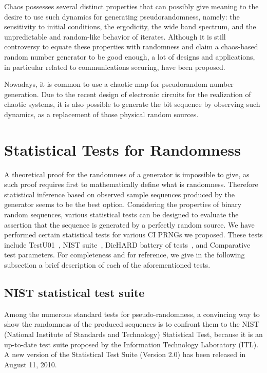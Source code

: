 Chaos possesses several distinct properties that can possibly give meaning to the desire to use such dynamics for generating pseudorandomness, namely: the sensitivity to initial conditions, the ergodicity, the wide band spectrum, and the unpredictable and random-like behavior of iterates.
Although it is still controversy to equate these properties with randomness and claim a chaos-based random number generator to be good enough, a lot of designs and applications, in particular related to communications securing, have been proposed.

Nowadays, it is common to use a chaotic map for pseudorandom number generation. Due to the recent design of electronic circuits for the realization of chaotic systems, it is also possible to generate the bit sequence by observing such dynamics, as a replacement of those physical random sources.

\section{Statistical Tests for Randomness}
\label{Some famous statistical tests of random number generators}

A theoretical proof for the randomness of a generator is impossible to give, as such proof requires first to mathematically define what is randomness. Therefore statistical inference based on observed sample sequences produced by the generator seems to be the best option. Considering the properties of binary
random sequences, various statistical tests can be designed to evaluate the assertion
that the sequence is generated by a perfectly random source. 
We have performed certain statistical tests for various CI PRNGs we proposed. These tests
include TestU01~\cite{Lecuyer2009}, NIST suite~\cite{ANDREW2008},
DieHARD battery of tests~\cite{Marsaglia1996}, and Comparative test parameters. For completeness and for reference, we give
in the following subsection a brief description of each of the
aforementioned tests.



\subsection{NIST statistical test suite}



Among the numerous standard tests for pseudo-randomness, a convincing way to show the randomness of the produced sequences is to confront them to the NIST (National Institute of Standards and Technology) Statistical Test, because it is an up-to-date test suite proposed by the Information Technology Laboratory (ITL). A new version of the Statistical Test Suite (Version 2.0) has been released in August 11, 2010.


